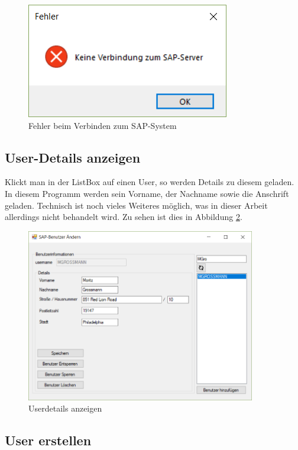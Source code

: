 \begin{figure}[h]
	\begin{center}
		\includegraphics[]{images/Keine_Verbindung.png}
	\end{center}
	\caption{Fehler beim Verbinden zum SAP-System}
	\label{fig:keine_verbindung}
\end{figure}

\subsection{User-Details anzeigen}

Klickt man in der ListBox auf einen User, so werden Details zu diesem geladen. In diesem Programm werden sein Vorname, der Nachname sowie die Anschrift geladen. 
Technisch ist noch vieles Weiteres möglich, was in dieser Arbeit allerdings nicht behandelt wird. Zu sehen ist dies in Abbildung \ref{fig:user_anzeigen}. 

\begin{figure}[h]
	\begin{center}
		\includegraphics[width=10cm]{images/User_Anzeigen.png}
	\end{center}
	\caption{Userdetails anzeigen}
	\label{fig:user_anzeigen}
\end{figure}

\subsection{User erstellen}

